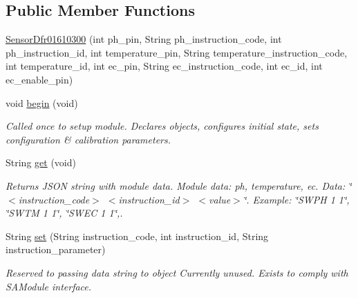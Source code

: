 \subsection*{Public Member Functions}
\begin{DoxyCompactItemize}
\item 
\hyperlink{class_sensor_dfr01610300_aeb40fef336ad2b2d82f7c5eddf9d318e}{Sensor\+Dfr01610300} (int ph\+\_\+pin, String ph\+\_\+instruction\+\_\+code, int ph\+\_\+instruction\+\_\+id, int temperature\+\_\+pin, String temperature\+\_\+instruction\+\_\+code, int temperature\+\_\+id, int ec\+\_\+pin, String ec\+\_\+instruction\+\_\+code, int ec\+\_\+id, int ec\+\_\+enable\+\_\+pin)
\item 
void \hyperlink{class_sensor_dfr01610300_a456221ff4728d8985c8e980d4f22b692}{begin} (void)
\begin{DoxyCompactList}\small\item\em Called once to setup module. Declares objects, configures initial state, sets configuration \& calibration parameters. \end{DoxyCompactList}\item 
String \hyperlink{class_sensor_dfr01610300_a21bbd0f8ee7e6576eabd9acf0e1e4d89}{get} (void)
\begin{DoxyCompactList}\small\item\em Returns J\+S\+O\+N string with module data. Module data\+: ph, temperature, ec. Data\+: \char`\"{}$<$instruction\+\_\+code$>$ $<$instruction\+\_\+id$>$ $<$value$>$\char`\"{}. Example\+: \char`\"{}\+S\+W\+P\+H 1 1\char`\"{}, \char`\"{}\+S\+W\+T\+M 1 1\char`\"{}, \char`\"{}\+S\+W\+E\+C 1 1\char`\"{},. \end{DoxyCompactList}\item 
String \hyperlink{class_sensor_dfr01610300_ab675c2708ff9d5d0d9bbe10bab3d97e8}{set} (String instruction\+\_\+code, int instruction\+\_\+id, String instruction\+\_\+parameter)
\begin{DoxyCompactList}\small\item\em Reserved to passing data string to object Currently unused. Exists to comply with S\+A\+Module interface. \end{DoxyCompactList}\end{DoxyCompactItemize}
